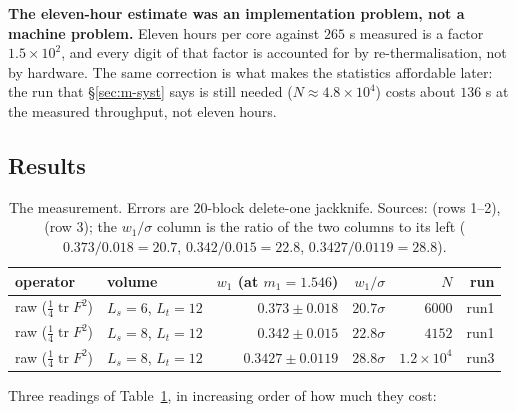 \begin{qbox}
\textbf{The eleven-hour estimate was an implementation problem, not a machine problem.} Eleven hours
per core against $265$ s measured is a factor $1.5\times10^{2}$, and every digit of that factor is
accounted for by re-thermalisation, not by hardware. The same correction is what makes the
statistics affordable later: the run that \S\ref{sec:m-syst} says is still needed
($N\approx4.8\times10^{4}$) costs about $136$ s at the measured throughput, not eleven hours.
\end{qbox}

\subsection{Results}
\label{sec:m-results}

\begin{table}[htbp]
\centering\small
\begin{tabular}{@{}llrrrr@{}}
\toprule
operator & volume & $w_1$ (at $m_1=1.546$) & $w_1/\sigma$ & $N$ & run \\
\midrule
raw ($\tfrac14\operatorname{tr}F^2$) & $L_s=6$, $L_t=12$ & $0.373\pm0.018$  & $20.7\sigma$ & $6000$  & run1 \\
raw ($\tfrac14\operatorname{tr}F^2$) & $L_s=8$, $L_t=12$ & $0.342\pm0.015$  & $22.8\sigma$ & $4152$  & run1 \\
raw ($\tfrac14\operatorname{tr}F^2$) & $L_s=8$, $L_t=12$ & $0.3427\pm0.0119$ & $28.8\sigma$ & $1.2\times10^{4}$ & run3 \\
\bottomrule
\end{tabular}
\caption{The measurement. Errors are $20$-block delete-one jackknife. Sources:
 (rows 1--2),  (row 3); the $w_1/\sigma$ column is the ratio of
the two columns to its left ($0.373/0.018=20.7$, $0.342/0.015=22.8$, $0.3427/0.0119=28.8$).}
\label{tab:m-results}
\end{table}

Three readings of Table~\ref{tab:m-results}, in increasing order of how much they cost:

